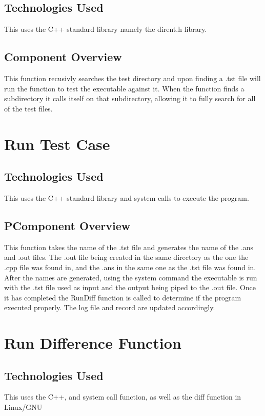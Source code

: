 \subsection{Technologies Used}
This uses the C++ standard library namely the dirent.h library.

\subsection{Component Overview}
This function recusivly searches the test directory and upon finding a .tst file will run the function to test the
executable against it.  When the function finds a subdirectory it calls itself on that subdirectory, allowing it to
fully search for all of the test files.


\section {Run Test Case}

\subsection {Technologies Used}
This uses the C++ standard library and system calls to execute the program.

\subsection {PComponent Overview}
This function takes the name of the .tst file and generates the name of the .ans and .out files.  The .out file being created in
the same directory as the one the .cpp file was found in, and the .ans in the same one as the .tst file was found in.
After the names are generated, using the system command the executable is run with the .tst file used as input
and the output being piped to the .out file.  Once it has completed the RunDiff function is called to determine
if the program executed properly.  The log file and record are updated accordingly.


\section{Run Difference Function}

\subsection{Technologies  Used}
This uses the C++, and system call function, as well as the diff function in Linux/GNU

